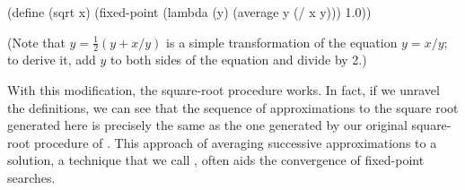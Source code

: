 \begin{codeBlock}
(define (sqrt x)
  (fixed-point (lambda (y) (average y (/ x y)))
               1.0))
\end{codeBlock}

\noindent
(Note that \( y = \frac{1}{2}(y + x / y) \) is a simple transformation of the
equation \( y = x / y; \) to derive it, add \( y \) to both sides of the
equation and divide by 2.)

With this modification, the square-root procedure works.  In fact, if we
unravel the definitions, we can see that the sequence of approximations to the
square root generated here is precisely the same as the one generated by our
original square-root procedure of .  This approach of
averaging successive approximations to a solution, a technique that we call
, often aids the convergence of fixed-point searches.

